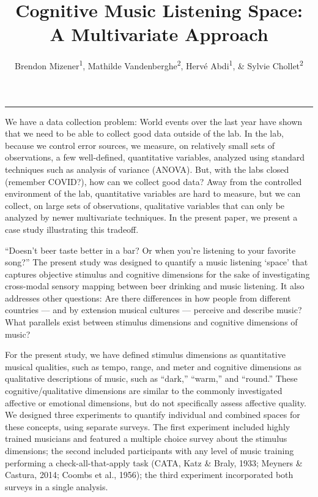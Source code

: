 \documentclass[
  english,
  man,floatsintext]{apa6}
\title{Cognitive Music Listening Space: A Multivariate Approach}
\author{Brendon Mizener\textsuperscript{1}, Mathilde Vandenberghe\textsuperscript{2}, Hervé Abdi\textsuperscript{1}, \& Sylvie Chollet\textsuperscript{2}}
\date{}
\affiliation{\vspace{0.5cm}\textsuperscript{1} University of Texas at Dallas\\\textsuperscript{2} Junia, Univ. Artois, Université de Liège, Univ. Littoral Côte d'Opale, UMRT 1158 BioEcoAgro, F-62000 Arras, France}
\begin{document}
\maketitle

\begin{center}\rule{0.5\linewidth}{0.5pt}\end{center}

We have a data collection problem: World events over the last year have shown that we need to be able to collect good data outside of the lab. In the lab, because we control error sources, we measure, on relatively small sets of observations, a few well-defined, quantitative variables, analyzed using standard techniques such as analysis of variance (ANOVA). But, with the labs closed (remember COVID?), how can we collect good data? Away from the controlled environment of the lab, quantitative variables are hard to measure, but we can collect, on large sets of observations, qualitative variables that can only be analyzed by newer multivariate techniques. In the present paper, we present a case study illustrating this tradeoff.

``Doesn't beer taste better in a bar? Or when you're listening to your favorite song?'' The present study was designed to quantify a music listening `space' that captures objective stimulus and cognitive dimensions for the sake of investigating cross-modal sensory mapping between beer drinking and music listening. It also addresses other questions: Are there differences in how people from different countries --- and by extension musical cultures --- perceive and describe music? What parallels exist between stimulus dimensions and cognitive dimensions of music?

For the present study, we have defined stimulus dimensions as quantitative musical qualities, such as tempo, range, and meter and cognitive dimensions as qualitative descriptions of music, such as ``dark,'' ``warm,'' and ``round.'' These cognitive/qualitative dimensions are similar to the commonly investigated affective or emotional dimensions, but do not specifically assess affective quality. We designed three experiments to quantify individual and combined spaces for these concepts, using separate surveys. The first experiment included highly trained musicians and featured a multiple choice survey about the stimulus dimensions; the second included participants with any level of music training performing a check-all-that-apply task (CATA, Katz \& Braly, 1933; Meyners \& Castura, 2014; Coombs et al., 1956); the third experiment incorporated both surveys in a single analysis.
\end{document}
